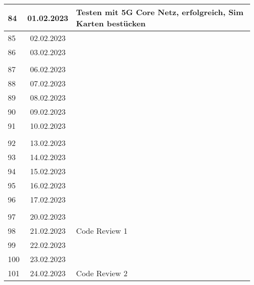 \begin{longtable}{|l|c|l|}
84  & 01.02.2023    &  Testen mit 5G Core Netz,  erfolgreich, Sim Karten bestücken                                                     \\ \hline 
85  & 02.02.2023    &                                                       \\ \hline 
86  & 03.02.2023    &                                                       \\ \hline
&               &                                                       \\ \hline  
87  & 06.02.2023    &                                                       \\ \hline 
88  & 07.02.2023    &                                                       \\ \hline 
89  & 08.02.2023    &                                                       \\ \hline 
90  & 09.02.2023    &                                                       \\ \hline 
91  & 10.02.2023    &                                                       \\ \hline
&               &                                                       \\ \hline  
92  & 13.02.2023    &                                                       \\ \hline 
93  & 14.02.2023    &                                                       \\ \hline 
94  & 15.02.2023    &                                                       \\ \hline 
95  & 16.02.2023    &                                                       \\ \hline 
96  & 17.02.2023    &                                                       \\ \hline
&               &                                                       \\ \hline  
97  & 20.02.2023    &                                                       \\ \hline 
98  & 21.02.2023    &  Code Review 1                                        \\ \hline 
99  & 22.02.2023    &                                                       \\ \hline 
100 & 23.02.2023    &                                                       \\ \hline 
101 & 24.02.2023    &  Code Review 2                                    \\ \hline

\end{longtable}

